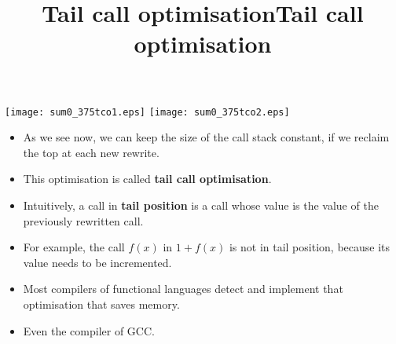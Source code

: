 \documentclass[wide]{slides}
\begin{document}
\begin{slide}
  \title{Tail call optimisation}

  \begin{center}
    \texttt{[image: sum0\_375tco1.eps]}
    \texttt{[image: sum0\_375tco2.eps]}
  \end{center}

\end{slide}

\begin{slide}
  \title{Tail call optimisation}

  \begin{itemize}

    \item As we see now, we can keep the size of the call stack
      constant, if we reclaim the top at each new rewrite.

    \item This optimisation is called \textbf{tail call optimisation}.

    \item Intuitively, a call in \textbf{tail position} is a call
      whose value is the value of the previously rewritten call.

    \item For example, the call \(f(x)\) in \(1 + f(x)\) is not in
      tail position, because its value needs to be incremented.

    \item Most compilers of functional languages detect and implement
      that optimisation that saves memory.

    \item Even the \Clang compiler of \textsf{GCC}.

  \end{itemize}

\end{slide}
\end{document}
